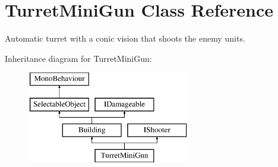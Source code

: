 \hypertarget{class_turret_mini_gun}{}\section{Turret\+Mini\+Gun Class Reference}
\label{class_turret_mini_gun}


Automatic turret with a conic vision that shoots the enemy units.  


Inheritance diagram for Turret\+Mini\+Gun\+:\begin{figure}[H]
\begin{center}
\leavevmode
\includegraphics[height=4.000000cm]{class_turret_mini_gun}
\end{center}
\end{figure}
